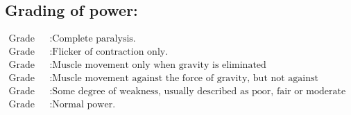 \documentclass[a4paper,12pt]{book}
\begin{document}
	\subsection*{Grading of power:}
	\par
	\begin{align*}
		\text{Grade 0} 	&:	\text{Complete paralysis.} \\
	\text{Grade 1} 	&: 	\text{Flicker of contraction only.}\\
		\text{Grade 2} 	&: \text{Muscle movement only when gravity is eliminated}\\
	\text{Grade 3} 	&:	\text{Muscle movement against the force of gravity, but not against resistance.} \\
	\text{Grade 4} 	&:	\text{Some degree of weakness, usually described as poor, fair or moderate 		strength.} \\
	\text{Grade 5} 	&:	\text{Normal power.}\\
	\end{align*}
\end{document}
